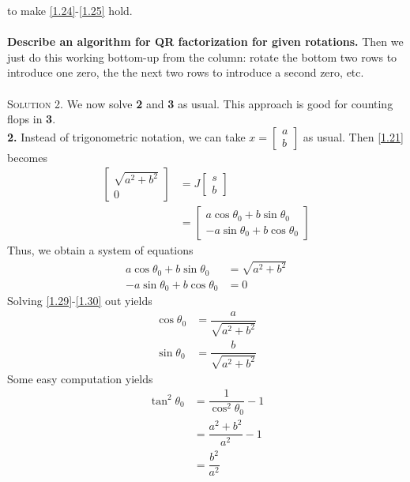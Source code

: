 \documentclass[a4paper,oneside]{book}
\numberwithin{equation}{chapter}
\begin{document}
to make \eqref{1.24}-\eqref{1.25} hold.\\
\\
\textbf{Describe an algorithm for QR factorization for given rotations.} Then we just do this working bottom-up from the column: rotate the bottom two rows to introduce one zero, the the next two rows to introduce a second zero, etc.\\
\\
\textsc{Solution 2.} We now solve \textbf{2} and \textbf{3} as usual. This approach is good for counting flops in \textbf{3}.\\
\textbf{2.} Instead of trigonometric notation, we can take   $x = \left[ {\begin{array}{*{20}{c}}
a\\
b
\end{array}} \right]$ as usual. Then \eqref{1.21} becomes
\begin{align}
\left[ {\begin{array}{*{20}{c}}
{\sqrt {{a^2} + {b^2}} }\\
0
\end{array}} \right]& = J\left[ {\begin{array}{*{20}{c}}
s\\
b
\end{array}} \right]\\
& = \left[ {\begin{array}{*{20}{c}}
{a\cos {\theta _0} + b\sin {\theta _0}}\\
{ - a\sin {\theta _0} + b\cos {\theta _0}}
\end{array}} \right]
\end{align}
Thus, we obtain a system of equations
\begin{align}
\label{1.29}
a\cos {\theta _0} + b\sin {\theta _0} &= \sqrt {{a^2} + {b^2}} \\
 - a\sin {\theta _0} + b\cos {\theta _0} &= 0 \label{1.30}
\end{align}
Solving \eqref{1.29}-\eqref{1.30} out yields
\begin{align}
\cos {\theta _0} &= \dfrac{a}{{\sqrt {{a^2} + {b^2}} }}\\
\sin {\theta _0} &= \dfrac{b}{{\sqrt {{a^2} + {b^2}} }}
\end{align}
Some easy computation yields
\begin{align}
{\tan ^2}{\theta _0} &= \dfrac{1}{{{{\cos }^2}{\theta _0}}} - 1\\
& = \dfrac{{{a^2} + {b^2}}}{{{a^2}}} - 1\\
& = \dfrac{{{b^2}}}{{{a^2}}}
\end{align}
\end{document}
